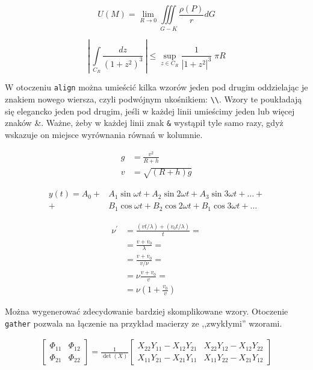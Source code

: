 \begin{equation}
	U(M) = \lim\limits_{R\to 0} \iiint\limits_{G-K}\frac{\rho(P)}{r}dG
\end{equation}

\begin{equation*}
	\left| \, \int\limits_{C_R} \frac{dz}{\left( 1+z^2 \right )^3} \, \right| \leqslant \sup\limits_{z \in C_R} \frac{1}{\left| 1+z^2 \right|^3} \; \pi R
\end{equation*}

W otoczeniu \texttt{align} można umieścić kilka wzorów jeden pod drugim oddzielając je znakiem nowego wiersza, czyli podwójnym ukośnikiem: \texttt{\textbackslash{}\textbackslash{}}. Wzory te poukładają się elegancko jeden pod drugim, jeśli w każdej linii umieścimy jeden lub więcej znaków \&. Ważne, żeby w każdej linii znak \texttt{\&} wystąpił tyle samo razy, gdyż wskazuje on miejsce wyrównania równań w kolumnie.

\begin{align}
	g & = \frac{v^2}{R+h}               \\
	v & = \sqrt{ \left( R+h \right) g }
\end{align}

\begin{align}
	y(t) = A_0
	+ & A_1 \sin \omega t +
	A_2 \sin 2 \omega t +
	A_3 \sin 3 \omega t + \ldots + \nonumber \\
	+ & B_1 \cos \omega t +
	B_2 \cos 2 \omega t +
	B_1 \cos 3 \omega t + \ldots
\end{align}

\begin{align}
	\nu^\prime & = \frac{\left(vt / \lambda \right) + \left( v_0t / \lambda \right)}{t} = \nonumber \\
	           & = \frac{v + v_0}{\lambda} = \nonumber                                              \\
	           & = \frac{v + v_0}{v / \nu} = \nonumber                                              \\
	           & = \nu \frac{v+v_0}{v} = \nonumber                                                  \\
	           & = \nu \left( 1 + \frac{v_0}{v} \right)
\end{align}

Można wygenerować zdecydowanie bardziej skomplikowane wzory. Otoczenie \texttt{gather} pozwala na łączenie na przykład macierzy ze ,,zwykłymi'' wzorami.

\begin{gather}
	\begin{bmatrix} \Phi_{11} & \Phi_{12} \\ \Phi_{21} & \Phi_{22} \end{bmatrix}
	=
	\frac{1}{\det(X)}
	\begin{bmatrix}
		X_{22} Y_{11} - X_{12} Y_{21} &
		X_{22} Y_{12} - X_{12} Y_{22}   \\
		X_{11} Y_{21} - X_{21} Y_{11} &
		X_{11} Y_{22} - X_{21} Y_{12}
	\end{bmatrix}
\end{gather}

